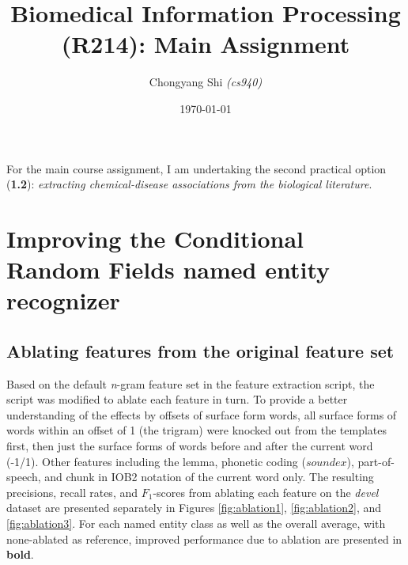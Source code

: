 \documentclass[10pt, oneside]{article}
\title{\vspace{-1cm}Biomedical Information Processing (R214): Main Assignment}
\author{Chongyang Shi \emph{(cs940)}}
\date{\today}
\begin{document}
\maketitle

For the main course assignment, I am undertaking the second practical option (\textbf{1.2}): \emph{extracting chemical-disease associations from the biological literature}.

\section{Improving the Conditional Random Fields named entity recognizer} \label{sec:a-crf-features}
\subsection{Ablating features from the original feature set} \label{subsec:ablating}

Based on the default \emph{n}-gram feature set in the feature extraction script, the script was modified to ablate each feature in turn. To provide a better understanding of the effects by offsets of surface form words, all surface forms of words within an offset of 1 (the trigram) were knocked out from the templates first, then just the surface forms of words before and after the current word (-1/1). Other features including the lemma, phonetic coding ($soundex$), part-of-speech, and chunk in IOB2 notation of the current word only. The resulting precisions, recall rates, and $F_1$-scores from ablating each feature on the \emph{devel} dataset are presented separately in Figures \ref{fig:ablation1}, \ref{fig:ablation2}, and \ref{fig:ablation3}. For each named entity class as well as the overall average, with none-ablated as reference, improved performance due to ablation are presented in \textbf{bold}.
\end{document}
